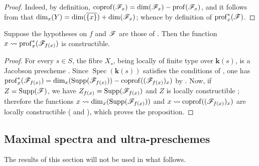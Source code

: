 \begin{proof}
Indeed, by definition, $\operatorname{coprof}(\mathscr{F}_x)=\dim(\mathscr{F}_x)-\operatorname{prof}(\mathscr{F}_x)$, and it follows from  that $\dim_x(Y)=\dim(\overline{\{x\}})+\dim(\mathscr{F}_x)$; whence  by definition of $\operatorname{prof}^*_x(\mathscr{F})$.
\end{proof}

\begin{corollary}[10.8.8]
\label{IV.10.8.8}
Suppose the hypotheses on $f$ and $\mathscr{F}$ are those of . Then the function $x\leadsto\operatorname{prof}^*_x(\mathscr{F}_{f(x)})$ is constructible.
\end{corollary}

\begin{proof}
For every $s\in S$, the fibre $X_s$, being locally of finite type over $\boldsymbol{k}(s)$, is a Jacobson prescheme . Since $\operatorname{Spec}(\boldsymbol{k}(s))$ satisfies the conditions of , one has $\operatorname{prof}^*_x(\mathscr{F}_{f(x)})
=\dim_x(\operatorname{Supp}(\mathscr{F}_{f(x)}))
-\operatorname{coprof}((\mathscr{F}_{f(x)})_x)$
by .
Now, if $Z=\operatorname{Supp}(\mathscr{F})$, we have $Z_{f(x)}=\operatorname{Supp}(\mathscr{F}_{f(x)})$  and $Z$ is locally constructible ; therefore the functions $x\leadsto\dim_x(\operatorname{Supp}(\mathscr{F}_{f(x)}))$ and $x\leadsto\operatorname{coprof}((\mathscr{F}_{f(x)})_x)$ are locally constructible ( and ), which proves the proposition.
\end{proof}

\subsection{Maximal spectra and ultra-preschemes}
\label{subsection:IV.10.9}

The results of this section will not be used in what follows.

